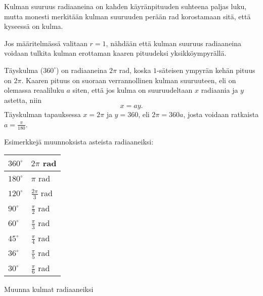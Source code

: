 Kulman suuruus radiaaneina on kahden käyränpituuden suhteena paljas luku, mutta monesti merkitään kulman suuruuden perään rad korostamaan sitä, että kyseessä on kulma.

Jos määritelmässä valitaan $r = 1$, nähdään että kulman suuruus radiaaneina voidaan tulkita kulman erottaman kaaren pituudeksi yksikköympyrällä.

Täyskulma ($360^\circ$) on radiaaneina $2\pi$ rad, koska $1$-säteisen ympyrän kehän pituus on $2\pi$. Kaaren pituus on suoraan verrannollinen kulman suuruuteen, eli on olemassa reaaliluku $a$ siten, että jos kulma on suuruudeltaan $x$ radiaania ja $y$ astetta, niin
\[x = a y.\]
Täyskulman tapauksessa $x = 2\pi$ ja $y = 360$, eli $2\pi = 360 a$, josta voidaan ratkaista $a = \frac{\pi}{180}$.


Esimerkkejä muunnoksista asteista radiaaneiksi: \\
\begin{tabular}{|l|l|}
\hline
$360^\circ$ & $2\pi$ rad \\
\hline
$180^\circ$ & $\pi$ rad \\
\hline
$120^\circ$ & $\frac{2\pi}{3}$ rad \\
\hline
$90^\circ$ & $\frac{\pi}{2}$ rad \\
\hline
$60^\circ$ & $\frac{\pi}{3}$ rad \\
\hline
$45^\circ$ & $\frac{\pi}{4}$ rad \\
\hline
$36^\circ$ & $\frac{\pi}{5}$ rad \\
\hline
$30^\circ$ & $\frac{\pi}{6}$ rad \\
\hline
\end{tabular}

\begin{tehtavasivu}
\begin{tehtava}
Muunna kulmat radiaaneiksi
\begin{alakohdat}
\end{alakohdat}

\begin{vastaus}
\begin{alakohdat}
\end{alakohdat}
\end{vastaus}
\end{tehtava}

\end{tehtavasivu}
